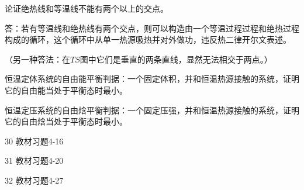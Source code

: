 \documentclass[CJK]{beamer}
\begin{document}
\begin{frame}
\bch
{\blue 论证绝热线和等温线不能有两个以上的交点。}


\skiplines

答：若有等温线和绝热线有两个交点，则可以构造由一个等温过程过程和绝热过程构成的循环，这个循环中从单一热源吸热并对外做功，违反热二律开尔文表述。

\skipline

（另一种答法：在$TS$图中它们是垂直的两条直线，显然无法相交于两点。）
\ech
\end{frame}

\begin{frame}
\bch
{\blue 恒温定体系统的自由能平衡判据：一个固定体积，并和恒温热源接触的系统，证明它的自由能当处于平衡态时最小。}


\ech
\end{frame}

\begin{frame}
\bch
{\blue 恒温定压系统的自由焓平衡判据：一个固定压强，并和恒温热源接触的系统，证明它的自由焓当处于平衡态时最小。}


\ech
\end{frame}


\begin{frame}
\bch

\bitem
\item[30]{教材习题4-16}
\item[31]{教材习题4-20}
\item[32]{教材习题4-27}
\eitem

\ech
\end{frame}
\end{document}
